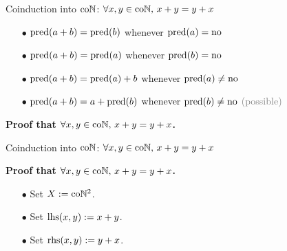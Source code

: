 
\renewcommand{\currentGoal}{$\forall x, y \in \coN,\, x + y = y + x$}

\begin{frame}[t]{Coinduction into $\mathrm{co}\mathbb{N}$: \currentGoal} %
  \simpleCoindNBlock

  \begin{itemize}
    \item[$\bullet$] {
      $\operatorname{pred}(a + b) = \operatorname{pred}(b)$ whenever $\operatorname{pred}(a) = \mathrm{no}$
    }
    \item[$\bullet$] {
      $\operatorname{pred}(a + b) = \operatorname{pred}(a)$ whenever $\operatorname{pred}(b) = \mathrm{no}$
    }
    \item[$\bullet$] {
      $\operatorname{pred}(a + b) = \operatorname{pred}(a) + b$ whenever $\operatorname{pred}(a) \neq \mathrm{no}$
    }
    \item[$\bullet$] {
      $\operatorname{pred}(a + b) = a + \operatorname{pred}(b)$ whenever $\operatorname{pred}(b) \neq \mathrm{no}$ \textcolor{gray}{(possible)}
    }
  \end{itemize}

  \vspace{0.5\baselineskip}

  \par\textbf{Proof that \currentGoal.}
  
\end{frame}

\begin{frame}[t]{Coinduction into $\mathrm{co}\mathbb{N}$: \currentGoal} %
  \simpleCoindNBlock

  \vspace{0.5 \baselineskip}

  \par\textbf{Proof that \currentGoal.}
  \vspace{0.5 \baselineskip}
  \begin{itemize}
    \item[$\bullet$] {
      Set $X := \mathrm{co}\mathbb{N}^2$.
    }
    \item[$\bullet$] {
      Set $\mathrm{lhs}(x, y) := x + y$.
    }
    \item[$\bullet$] {
      Set $\mathrm{rhs}(x, y) := y + x$.
    }
  \end{itemize}

\end{frame}

